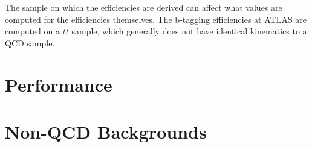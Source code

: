 The sample on which the efficiencies are derived can affect what values are computed for the efficiencies themselves.  The b-tagging efficiencies at ATLAS are computed on a $t\bar{t}$ sample, which generally does not have identical kinematics to a QCD sample.   


\section{Performance}

\section{Non-QCD Backgrounds}




